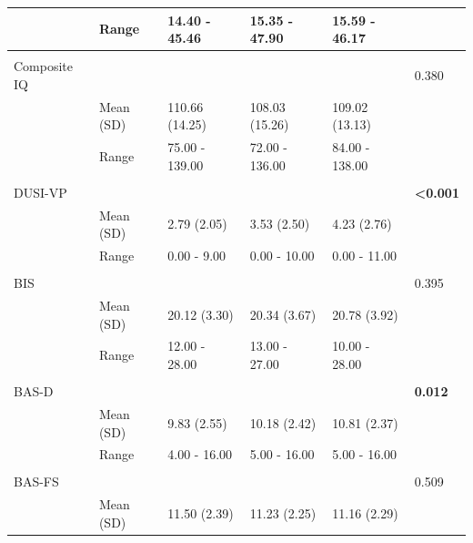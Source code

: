\documentclass[utf8]{stylesheet}
\begin{document}
\begin{table}[h!]
\begin{tabular}{llllll}
                    & Range           & 14.40 - 45.46  & 15.35 - 47.90  & 15.59 - 46.17  &                          \\ \hline \\
Composite IQ        &                 &                  &                  &                  & 0.380                    \\
                    & Mean (SD)       & 110.66 (14.25) & 108.03 (15.26) & 109.02 (13.13) &                          \\
                    & Range           & 75.00 - 139.00 & 72.00 - 136.00 & 84.00 - 138.00 &                          \\ \hline \\
DUSI-VP    &                 &                  &                  &                  & \textbf{\textless 0.001} \\
                    & Mean (SD)       & 2.79 (2.05)    & 3.53 (2.50)    & 4.23 (2.76)    &                          \\
                    & Range           & 0.00 - 9.00    & 0.00 - 10.00   & 0.00 - 11.00   &                          \\ \hline \\
BIS                 &                 &                  &                  &                  & 0.395                    \\
                    & Mean (SD)       & 20.12 (3.30)   & 20.34 (3.67)   & 20.78 (3.92)   &                          \\
                    & Range           & 12.00 - 28.00  & 13.00 - 27.00  & 10.00 - 28.00  &                          \\ \hline \\
BAS-D &                 &                  &                  &                  & \textbf{0.012}           \\
                    & Mean (SD)       & 9.83 (2.55)    & 10.18 (2.42)   & 10.81 (2.37)   &                          \\
                    & Range           & 4.00 - 16.00   & 5.00 - 16.00   & 5.00 - 16.00   &                          \\ \hline \\
BAS-FS     &                 &                  &                  &                  & 0.509                    \\
                    & Mean (SD)       & 11.50 (2.39)   & 11.23 (2.25)   & 11.16 (2.29)   &                          \\

\end{tabular}
\end{table}
\end{document}
